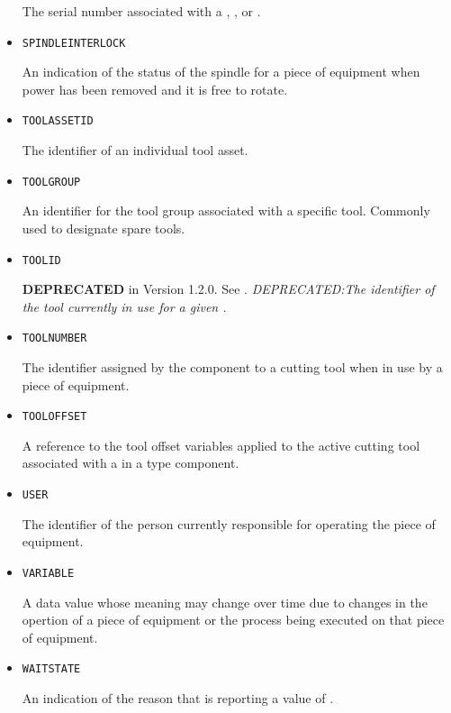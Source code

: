 \begin{itemize}
The serial number associated with a , , or .


\item \texttt{SPINDLE\textunderscore INTERLOCK}  

An indication of the status of the spindle for a piece of equipment when power has been removed and it is free to rotate.


\item \texttt{TOOL\textunderscore ASSET\textunderscore ID}  

The identifier of an individual tool asset.


\item \texttt{TOOL\textunderscore GROUP}  

An identifier for the tool group associated with a specific tool. Commonly used to designate spare tools.


\item \texttt{TOOL\textunderscore ID}  

\textbf{DEPRECATED} in Version 1.2.0.   See . \textit{DEPRECATED:The identifier of the tool currently in use for a given .}


\item \texttt{TOOL\textunderscore NUMBER}  

The identifier assigned by the  component to a cutting tool when in use by a piece of equipment.


\item \texttt{TOOL\textunderscore OFFSET}  

A reference to the tool offset variables applied to the active cutting tool associated with a  in a  type component.


\item \texttt{USER}  

The identifier of the person currently responsible for operating the piece of equipment.


\item \texttt{VARIABLE}  

A data value whose meaning may change over time due to changes in the opertion of a piece of equipment or the process being executed on that piece of equipment.


\item \texttt{WAIT\textunderscore STATE}  

An indication of the reason that  is reporting a value of .



\end{itemize}
